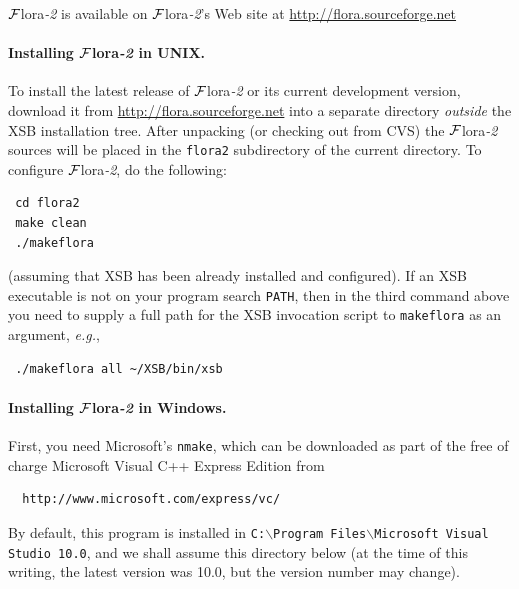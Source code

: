 \documentclass[11pt]{article}
\newcommand{\FLORA}{{\mbox{\sc ${\cal F}${lora}\rm\emph{-2}}}\xspace}
\begin{document}
\FLORA is available on \FLORA's Web site at \url{http://flora.sourceforge.net}

\paragraph{Installing \FLORA in UNIX.}
To install the latest release
of \FLORA or its current development version, download it from \url{http://flora.sourceforge.net} into a separate directory \emph{outside}
the XSB installation tree. After unpacking (or checking out from CVS) the
\FLORA sources will be placed in the {\tt flora2} subdirectory of the current
directory. To
configure \FLORA, do the following:
\begin{verbatim}
 cd flora2
 make clean
 ./makeflora
\end{verbatim}
(assuming that XSB has been already installed and configured).
If an XSB executable is not on your program search {\tt PATH}, then in the
third command above you
need to supply a full path for the XSB invocation script to {\tt makeflora} as
an argument, {\it e.g.},
\begin{verbatim}
 ./makeflora all ~/XSB/bin/xsb
\end{verbatim}

\paragraph{Installing \FLORA in Windows.}
First, you need Microsoft's {\tt nmake}, which can be downloaded as
part of the free of charge Microsoft Visual C++ Express Edition from
\begin{verbatim}
  http://www.microsoft.com/express/vc/ 
\end{verbatim}
By default, this program is installed in
\texttt{C:$\backslash$Program Files$\backslash$Microsoft Visual Studio 10.0},
and we shall assume this
directory below (at the time of this writing, the latest version was 10.0,
but the version number may change).
\end{document}
